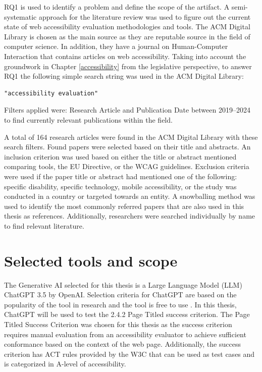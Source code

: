 RQ1 is used to identify a problem and define the scope of the artifact. A semi-systematic approach for the literature review was used to figure out the current state of web accessibility evaluation methodologies and tools. The ACM Digital Library is chosen as the main source as they are reputable source in the field of computer science. In addition, they have a journal on Human-Computer Interaction that contains articles on web accessibility. Taking into account the groundwork in Chapter \ref{accessibility} from the legislative perspective, to answer RQ1 the following simple search string was used in the ACM Digital Library:

\begin{verbatim}
"accessibility evaluation"
\end{verbatim}

Filters applied were: Research Article and Publication Date between 2019--2024 to find currently relevant publications within the field. 

A total of 164 research articles were found in the ACM Digital Library with these search filters. Found papers were selected based on their title and abstracts. An inclusion criterion was used based on either the title or abstract mentioned comparing tools, the EU Directive, or the WCAG guidelines. Exclusion criteria were used if the paper title or abstract had mentioned one of the following: specific disability, specific technology, mobile accessibility, or the study was conducted in a country or targeted towards an entity. A snowballing method was used to identify the most commonly referred papers that are also used in this thesis as references. Additionally, researchers were searched individually by name to find relevant literature.

\section{Selected tools and scope}

The Generative AI selected for this thesis is a Large Language Model (LLM) ChatGPT 3.5 by OpenAI. Selection criteria for ChatGPT are based on the popularity of the tool in research and the tool is free to use \citep{ouyang2023llm, white2023prompt}. In this thesis, ChatGPT will be used to test the 2.4.2 Page Titled success criterion. The Page Titled Success Criterion was chosen for this thesis as the success criterion requires manual evaluation from an accessibility evaluator to achieve sufficient conformance based on the context of the web page. Additionally, the success criterion has ACT rules provided by the W3C that can be used as test cases and is categorized in A-level of accessibility. 

